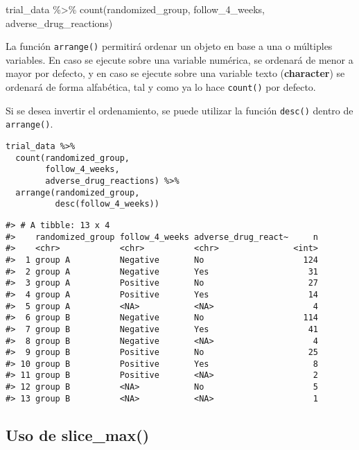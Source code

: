 \documentclass[
]{book}
\newenvironment{Shaded}{\begin{snugshade}}{\end{snugshade}}
\newcommand{\FunctionTok}[1]{\textcolor[rgb]{0.00,0.00,0.00}{#1}}
\newcommand{\NormalTok}[1]{#1}
\newcommand{\SpecialCharTok}[1]{\textcolor[rgb]{0.00,0.00,0.00}{#1}}
\begin{document}
\begin{Shaded}
\begin{Highlighting}[]
\NormalTok{trial\_data }\SpecialCharTok{\%\textgreater{}\%} 
  \FunctionTok{count}\NormalTok{(randomized\_group, }
\NormalTok{        follow\_4\_weeks,}
\NormalTok{        adverse\_drug\_reactions)}
\end{Highlighting}
\end{Shaded}

La función \texttt{arrange()} permitirá ordenar un objeto en base a una o múltiples variables. En caso se ejecute sobre una variable numérica, se ordenará de menor a mayor por defecto, y en caso se ejecute sobre una variable texto (\textbf{character}) se ordenará de forma alfabética, tal y como ya lo hace \texttt{count()} por defecto.

Si se desea invertir el ordenamiento, se puede utilizar la función \texttt{desc()} dentro de \texttt{arrange()}.

\begin{verbatim}
trial_data %>%
  count(randomized_group,
        follow_4_weeks,
        adverse_drug_reactions) %>%
  arrange(randomized_group,
          desc(follow_4_weeks))
\end{verbatim}

\begin{verbatim}
#> # A tibble: 13 x 4
#>    randomized_group follow_4_weeks adverse_drug_react~     n
#>    <chr>            <chr>          <chr>               <int>
#>  1 group A          Negative       No                    124
#>  2 group A          Negative       Yes                    31
#>  3 group A          Positive       No                     27
#>  4 group A          Positive       Yes                    14
#>  5 group A          <NA>           <NA>                    4
#>  6 group B          Negative       No                    114
#>  7 group B          Negative       Yes                    41
#>  8 group B          Negative       <NA>                    4
#>  9 group B          Positive       No                     25
#> 10 group B          Positive       Yes                     8
#> 11 group B          Positive       <NA>                    2
#> 12 group B          <NA>           No                      5
#> 13 group B          <NA>           <NA>                    1
\end{verbatim}

\hypertarget{uso-de-slice_max}{%
\subsection{Uso de slice\_max()}\label{uso-de-slice_max}}
\end{document}
